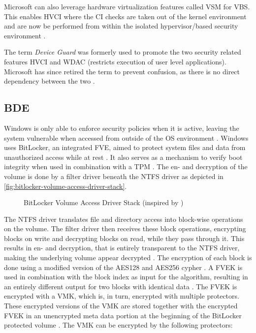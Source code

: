 Microsoft can also leverage hardware virtualization features called \ac{VSM} for \ac{VBS}.
This enables \ac{HVCI} where the \ac{CI} checks are taken out of the kernel environment and are now be performed from within the isolated hypervisor\-/based security environment \cite{micosoft-windows-oem-vbs}.

The term \emph{Device Guard} was formerly used to promote the two security related features \ac{HVCI} and \ac{WDAC} (restricts execution of user level applications).
Microsoft has since retired the term to prevent confusion, as there is no direct dependency between the two \cite{microsoft-windows-no-longer-device-guard}.

\subsection{\acf{BDE}}
\label{sec:windows:security:bde}

Windows is only able to enforce security policies when it is active, leaving the system vulnerable when accessed from outside of the \ac{OS} environment \cite[Section 9]{windows-internals-6-part2}.
Windows uses BitLocker, an integrated \ac{FVE}, aimed to protect system files and data from unauthorized access while at rest \cite{microsoft-bitlocker-overview}.
It also serves as a mechanism to verify boot integrity when used in combination with a \ac{TPM} \cite[Section 9]{windows-internals-6-part2}.
The en- and decryption of the volume is done by a filter driver beneath the \ac{NTFS} driver as depicted in \autoref{fig:bitlocker-volume-access-driver-stack}.

\begin{figure}[htb]%
    \centering
    
    \caption[BitLocker Volume Access Driver Stack]{BitLocker Volume Access Driver Stack (inspired by \cite[Figure 9-24]{windows-internals-6-part2})}%
    \label{fig:bitlocker-volume-access-driver-stack}%
\end{figure}

The \ac{NTFS} driver translates file and directory access into block-wise operations on the volume.
The filter driver then receives these block operations, encrypting blocks on write and decrypting blocks on read, while they pass through it.
This results in en- and decryption, that is entirely transparent to the \ac{NTFS} driver, making the underlying volume appear decrypted \cite[Section 9]{windows-internals-6-part2}.
The encryption of each block is done using a modified version of the \ac{AES}128 and \ac{AES}256 cypher \cite[Section 9]{windows-internals-6-part2}.
A \ac{FVEK} is used in combination with the block index as input for the algorithm, resulting in an entirely different output for two blocks with identical data \cite[Section 9]{windows-internals-6-part2}.
The \ac{FVEK} is encrypted with a \ac{VMK}, which is, in turn, encrypted with multiple protectors.
These encrypted versions of the \ac{VMK} are stored together with the encrypted \ac{FVEK} in an unencrypted meta data portion at the beginning of the BitLocker protected volume \cite[Section 9]{windows-internals-6-part2}.
The \ac{VMK} can be encrypted by the following protectors:

